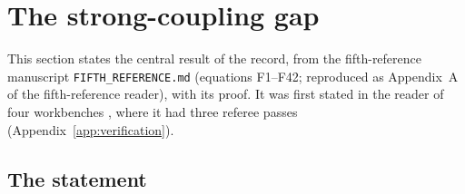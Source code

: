\section{The strong-coupling gap}\label{sec:gap}

This section states the central result of the record, from the fifth-reference manuscript \texttt{FIFTH\_REFERENCE.md} (equations F1--F42; reproduced as Appendix~A of the fifth-reference reader), with its proof. It was first stated in the reader of four workbenches \cite{WorkbenchReader}, where it had three referee passes (Appendix~\ref{app:verification}).

\subsection{The statement}

